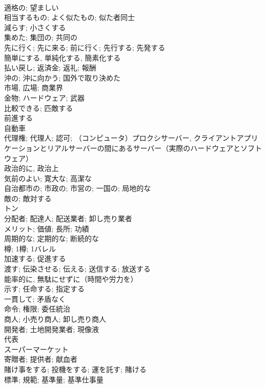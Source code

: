 \documentclass[8pt]{extreport}
\begin{document}
\begin{CJK}{UTF8}{min}
\\	適格の; 望ましい	
\\	相当するもの; よく似たもの; 似た者同士	
\\	減らす; 小さくする	
\\	集めた; 集団の; 共同の	
\\	先に行く; 先に来る; 前に行く; 先行する; 先発する	
\\	簡単にする, 単純化する, 簡素化する	
\\	払い戻し; 返済金; 返礼; 報酬	
\\	沖の; 沖に向かう; 国外で取り決めた	
\\	市場, 広場; 商業界	
\\	金物; ハードウェア; 武器	
\\	比較できる; 匹敵する	
\\	前進する	
\\	自動車	
\\	代理権; 代理人; 認可; （コンピュータ）プロクシサーバー, クライアントアプリケーションとリアルサーバーの間にあるサーバー（実際のハードウェアとソフトウェア）	
\\	政治的に, 政治上	
\\	気前のよい; 寛大な; 高潔な	
\\	自治都市の; 市政の; 市営の; 一国の; 局地的な	
\\	敵の; 敵対する	
\\	トン	
\\	分配者; 配達人; 配送業者; 卸し売り業者	
\\	メリット; 価値; 長所; 功績	
\\	周期的な; 定期的な; 断続的な
\\	樽; 1樽; 1バレル	
\\	加速する; 促進する	
\\	渡す; 伝染させる; 伝える; 送信する; 放送する	
\\	能率的に, 無駄にせずに（時間や労力を）	
\\	示す; 任命する; 指定する	
\\	一貫して; 矛盾なく	
\\	命令; 権限; 委任統治	
\\	商人; 小売り商人; 卸し売り商人	
\\	開発者; 土地開発業者; 現像液	
\\	代表	
\\	スーパーマーケット	
\\	寄贈者; 提供者; 献血者	
\\	賭け事をする; 投機をする; 運を託す; 賭ける	
\\	標準; 規範; 基準量; 基準仕事量	

\end{CJK}
\end{document}
